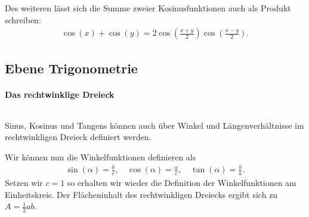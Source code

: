 Des weiteren lässt sich die Summe zweier Kosinusfunktionen auch als Produkt schreiben: 
\begin{align}
    \cos(x) + \cos(y) = 2 \cos(\frac{x+y}{2}) \cos(\frac{x-y}{2}).
\end{align}

\subsection{Ebene Trigonometrie}

\paragraph{Das rechtwinklige Dreieck}$~$

Sinus, Kosinus und Tangens können auch über Winkel und Längenverhältnisse im rechtwinkligen Dreieck definiert werden. 
\begin{figure}[htp]
    \centering
\end{figure}

Wir können nun die Winkelfunktionen definieren als 
\begin{align}
    \sin(\alpha) = \frac{b}{c}, \quad \cos(\alpha) = \frac{a}{c}, \quad \tan(\alpha) = \frac{b}{a}.
\end{align}
Setzen wir $c=1$ so erhalten wir wieder die Definition der Winkelfunktionen am Einheitskreis. Der Flächeninhalt des rechtwinkligen Dreiecks ergibt sich zu $A = \frac{1}{2}ab$.

